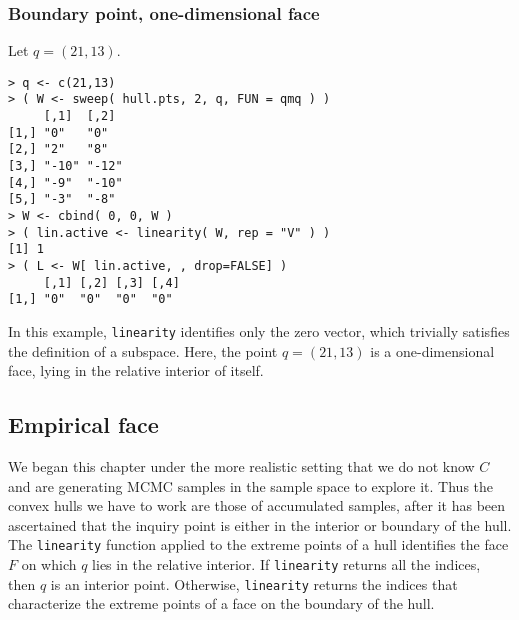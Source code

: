 \subsubsection{Boundary point, one-dimensional face}
Let $q = (21,13)$.
\begin{verbatim}
> q <- c(21,13)
> ( W <- sweep( hull.pts, 2, q, FUN = qmq ) )
     [,1]  [,2] 
[1,] "0"   "0"  
[2,] "2"   "8"  
[3,] "-10" "-12"
[4,] "-9"  "-10"
[5,] "-3"  "-8" 
> W <- cbind( 0, 0, W )
> ( lin.active <- linearity( W, rep = "V" ) )
[1] 1
> ( L <- W[ lin.active, , drop=FALSE] )
     [,1] [,2] [,3] [,4]
[1,] "0"  "0"  "0"  "0" 
\end{verbatim}
In this example, \texttt{linearity} identifies only the zero vector, which
trivially satisfies the definition of a subspace.  Here, the point $q = (21,13)$
is a one-dimensional face, lying in the relative interior of itself.

\subsection{Empirical face}
We began this chapter under the more realistic setting that we do not know
$C$ and are generating MCMC samples in the sample space to explore it.  
Thus the convex hulls we have to work are those of accumulated samples,
after it has been ascertained that the inquiry point is either in the interior
or boundary of the hull.  The \texttt{linearity} function applied to the extreme points of a hull identifies the face $F$ on which $q$ lies in the relative interior.  
If \texttt{linearity} returns all the indices, then $q$ is an interior point.  Otherwise, \texttt{linearity} returns the indices that characterize the extreme
points of a face on the boundary of the hull.  


